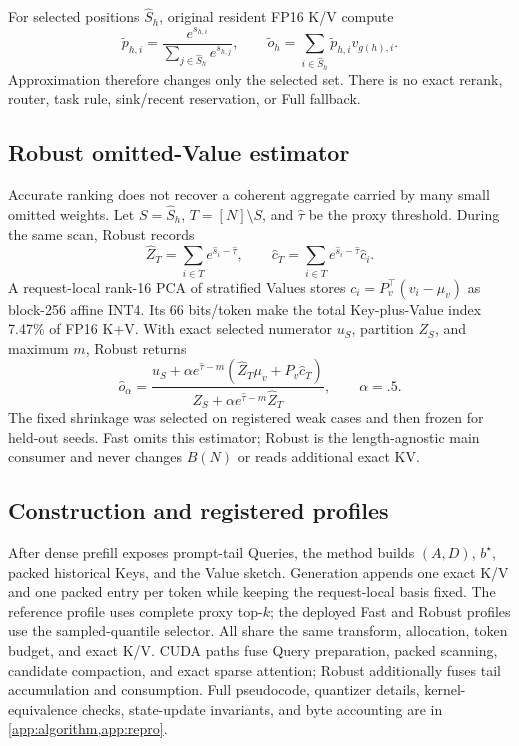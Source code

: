 For selected positions $\widehat S_h$, original resident FP16 K/V compute
\begin{equation}
 \widetilde p_{h,i}=\frac{e^{s_{h,i}}}
 {\sum_{j\in\widehat S_h}e^{s_{h,j}}},\qquad
 \widetilde o_h=\sum_{i\in\widehat S_h}\widetilde p_{h,i}v_{g(h),i}.
 \label{eq:sparse-attn}
\end{equation}
Approximation therefore changes only the selected set.  There is no exact
rerank, router, task rule, sink/recent reservation, or Full fallback.

\subsection{Robust omitted-Value estimator}

Accurate ranking does not recover a coherent aggregate carried by many
small omitted weights.  Let $S=\widehat S_h$, $T=[N]\setminus S$, and
$\widehat\tau$ be the proxy threshold.  During the same scan, Robust records
\begin{equation}
 \widehat Z_T=\sum_{i\in T}e^{\widehat s_i-\widehat\tau},\qquad
 \widehat c_T=\sum_{i\in T}e^{\widehat s_i-\widehat\tau}\widehat c_i.
 \label{eq:value-tail-statistics}
\end{equation}
A request-local rank-16 PCA of stratified Values stores
$c_i=P_v^\top(v_i-\mu_v)$ as block-256 affine INT4.  Its 66 bits/token make
the total Key-plus-Value index 7.47\% of FP16 K+V.  With exact selected
numerator $u_S$, partition $Z_S$, and maximum $m$, Robust returns
\begin{equation}
 \widehat o_\alpha=
 \frac{u_S+\alpha e^{\widehat\tau-m}
 (\widehat Z_T\mu_v+P_v\widehat c_T)}
 {Z_S+\alpha e^{\widehat\tau-m}\widehat Z_T},\qquad\alpha=.5.
 \label{eq:robust-tail-output}
\end{equation}
The fixed shrinkage was selected on registered weak cases and then frozen for
held-out seeds.  Fast omits this estimator; Robust is the length-agnostic main
consumer and never changes $B(N)$ or reads additional exact KV.

\subsection{Construction and registered profiles}

After dense prefill exposes prompt-tail Queries, the method builds $(A,D)$,
$b^\star$, packed historical Keys, and the Value sketch.  Generation appends
one exact K/V and one packed entry per token while keeping the request-local
basis fixed.  The reference profile uses complete proxy top-$k$; the deployed
Fast and Robust profiles use the sampled-quantile selector.  All share the
same transform, allocation, token budget, and exact K/V.  CUDA paths fuse
Query preparation, packed scanning, candidate compaction, and exact sparse
attention; Robust additionally fuses tail accumulation and consumption.
Full pseudocode, quantizer details, kernel-equivalence checks, state-update
invariants, and byte accounting are in \cref{app:algorithm,app:repro}.
